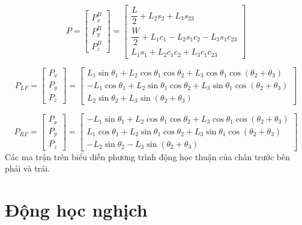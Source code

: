 \begin{equation}
P =
\begin{bmatrix}
P_x^B \\
P_y^B \\
P_z^B
\end{bmatrix}
=
\begin{bmatrix}
\dfrac{L}{2}+L_2 s_2 + L_3 s_{23} \\
\dfrac{W}{2}+L_1 c_1 - L_2 s_1 c_2 - L_3 s_1 c_{23} \\
L_1 s_1 + L_2 c_1 c_2 + L_3 c_1 c_{23}
\end{bmatrix}
\end{equation}

\begin{equation}
P_{LF}=
\begin{bmatrix}
P_x \\
P_y \\
P_z
\end{bmatrix}
=
\begin{bmatrix}
L_1\sin\theta_1 + L_2\cos\theta_1\cos\theta_2 + L_3\cos\theta_1\cos(\theta_2+\theta_3) \\
- L_1\cos\theta_1 + L_2\sin\theta_1\cos\theta_2 + L_3\sin\theta_1\cos(\theta_2+\theta_3) \\
L_2\sin\theta_2 + L_3\sin(\theta_2+\theta_3)
\end{bmatrix}
\label{eq:1}
\end{equation}

\begin{equation}
P_{RF}=
\begin{bmatrix}
P_x \\
P_y \\
P_z
\end{bmatrix}
=
\begin{bmatrix}
- L_1\sin\theta_1 + L_2\cos\theta_1\cos\theta_2 + L_3\cos\theta_1\cos(\theta_2+\theta_3) \\
L_1\cos\theta_1 + L_2\sin\theta_1\cos\theta_2 + L_3\sin\theta_1\cos(\theta_2+\theta_3) \\
- L_2\sin\theta_2 - L_3\sin(\theta_2+\theta_3)
\end{bmatrix}
\label{eq:2}
\end{equation}
Các ma trận trên biểu diễn phương trình động học thuận của chân trước bên phải và trái.

\section{Động học nghịch }

